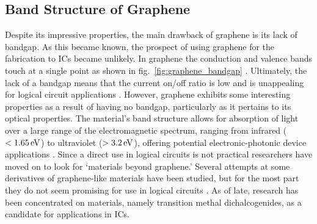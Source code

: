 \subsection{Band Structure of Graphene}\label{subsec:graphene_bandstructure}
\noindent Despite its impressive properties, the main drawback of graphene is its lack of bandgap. As this became known, the prospect of using graphene for the fabrication to ICs became unlikely. In graphene the conduction and valence bands touch at a single point as shown in fig.~\ref{fig:graphene_bandgap} \cite{Wallace_PhysRev1947}. Ultimately, the lack of a bandgap means that the current on/off ratio is low and is unappealing for logical circuit applications \cite{Xu_ChemRev2013}. However, graphene exhibits some interesting properties as a result of having no bandgap, particularly as it pertains to its optical properties. The material's band structure allows for absorption of light over a large range of the electromagnetic spectrum, ranging from infrared ($<1.65\,\mathrm{eV}$) to ultraviolet ($>3.2\,\mathrm{eV}$), offering potential electronic-photonic device applications \cite{Xia_NatureNano2009,Wang_Science2008,Geim_NatureComm2011}. Since a direct use in logical circuits is not practical researchers have moved on to look for `\td materials beyond graphene.' Several attempts at some derivatives of graphene-like materials have been studied, but for the most part they do not seem promising for use in logical circuits \cite{Takeda_PhysRev1994,Cahangirov_PhysRevLett2009}. As of late, research has been concentrated on \td materials, namely transition methal dichalcogenides, as a candidate for applications in ICs.

